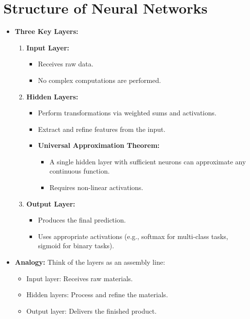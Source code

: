 \documentclass{article}
\begin{document}
\section{Structure of Neural Networks}

\begin{itemize}
    \item \textbf{Three Key Layers:}
    \begin{enumerate}
        \item \textbf{Input Layer:}
        \begin{itemize}
            \item Receives raw data.
            \item No complex computations are performed.
        \end{itemize}
        \item \textbf{Hidden Layers:}
        \begin{itemize}
            \item Perform transformations via weighted sums and activations.
            \item Extract and refine features from the input.
            \item \textbf{Universal Approximation Theorem:}
             \begin{itemize}
                \item A single hidden layer with sufficient neurons can approximate any continuous function.
                \item Requires non-linear activations.
            \end{itemize}
        \end{itemize}
        \item \textbf{Output Layer:}
        \begin{itemize}
            \item Produces the final prediction.
            \item Uses appropriate activations (e.g., softmax for multi-class tasks, sigmoid for binary tasks).
        \end{itemize}
    \end{enumerate}
    
    \item \textbf{Analogy:} Think of the layers as an assembly line:
    \begin{itemize}
        \item Input layer: Receives raw materials.
        \item Hidden layers: Process and refine the materials.
        \item Output layer: Delivers the finished product.
    \end{itemize}
    

\end{itemize}
\end{document}
